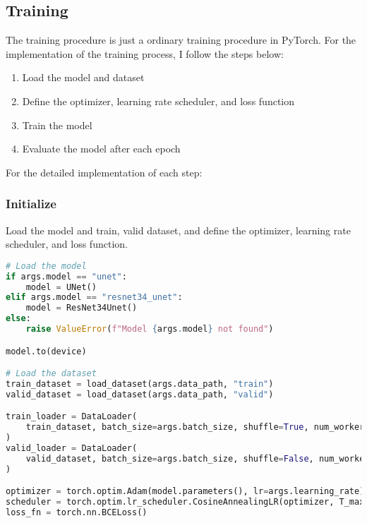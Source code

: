 \subsection{Training}
The training procedure is just a ordinary training procedure in PyTorch.
For the implementation of the training process, I follow the steps below:
\begin{enumerate}
    \item Load the model and dataset
    \item Define the optimizer, learning rate scheduler, and loss function
    \item Train the model
    \item Evaluate the model after each epoch
\end{enumerate}

For the detailed implementation of each step:


\subsubsection{Initialize}
Load the model and train, valid dataset, and define the optimizer, learning rate scheduler, and loss function.
\begin{lstlisting}[language=Python, caption=train.py: Initialize, label=lst:train_initialize]
# Load the model
if args.model == "unet":
    model = UNet()
elif args.model == "resnet34_unet":
    model = ResNet34Unet()
else:
    raise ValueError(f"Model {args.model} not found")

model.to(device)

# Load the dataset
train_dataset = load_dataset(args.data_path, "train")
valid_dataset = load_dataset(args.data_path, "valid")

train_loader = DataLoader(
    train_dataset, batch_size=args.batch_size, shuffle=True, num_workers=32
)
valid_loader = DataLoader(
    valid_dataset, batch_size=args.batch_size, shuffle=False, num_workers=32
)

optimizer = torch.optim.Adam(model.parameters(), lr=args.learning_rate)
scheduler = torch.optim.lr_scheduler.CosineAnnealingLR(optimizer, T_max=args.epochs)
loss_fn = torch.nn.BCELoss()
\end{lstlisting}


